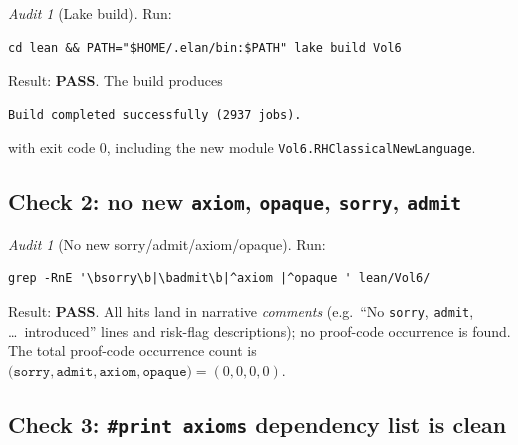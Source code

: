 \documentclass[11pt]{article}
\theoremstyle{plain}
\theoremstyle{definition}
\theoremstyle{remark}
\newtheorem{audit}[theorem]{Audit}
\newcommand{\code}[1]{\texttt{#1}}
\begin{document}
\begin{audit}[Lake build]
\label{audit:lake-build}
Run:
\begin{lstlisting}
cd lean && PATH="$HOME/.elan/bin:$PATH" lake build Vol6
\end{lstlisting}
Result: \textbf{PASS}.  The build produces

\begin{lstlisting}
Build completed successfully (2937 jobs).
\end{lstlisting}

with exit code 0, including the new module
\code{Vol6.RHClassicalNewLanguage}.
\end{audit}

\subsection{Check 2: no new \texttt{axiom}, \texttt{opaque}, \texttt{sorry}, \texttt{admit}}
\label{sec:check-2}

\begin{audit}[No new sorry/admit/axiom/opaque]
\label{audit:no-sorry}
Run:
\begin{lstlisting}
grep -RnE '\bsorry\b|\badmit\b|^axiom |^opaque ' lean/Vol6/
\end{lstlisting}
Result: \textbf{PASS}. All hits land in narrative \emph{comments} (e.g.\
``No \texttt{sorry}, \texttt{admit}, \dots\ introduced'' lines and
risk-flag descriptions); no proof-code occurrence is found.  The total
proof-code occurrence count is
\(\bigl(\code{sorry}, \code{admit}, \texttt{axiom}, \texttt{opaque}\bigr)
   = (0, 0, 0, 0)\).
\end{audit}

\subsection{Check 3: \texttt{\#print axioms} dependency list is clean}
\label{sec:check-3}
\end{document}
